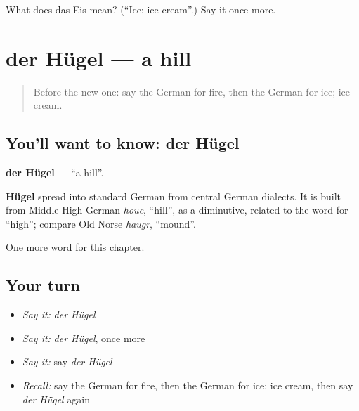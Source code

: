 \begin{tcolorbox}[breakable,colback=teal!4,colframe=teal!35!black,title={Before you move on}]
What does das Eis mean? (\textquotedblleft{}Ice; ice cream\textquotedblright{}.) Say it once more.
\end{tcolorbox}
\section[der Hügel]{der Hügel — a hill}

\label{lesson:GE-C85-huegel}



\begin{quote}
Before the new one: say the German for fire, then the German for ice; ice cream.
\end{quote}

\subsection*{You'll want to know: der Hügel}
\textbf{der Hügel} — \textquotedblleft{}a hill\textquotedblright{}.

\begin{cousinweb}
\textbf{Hügel} spread into standard German from central German dialects. It is built from Middle High German \emph{houc}, \textquotedblleft{}hill\textquotedblright{}, as a diminutive, related to the word for \textquotedblleft{}high\textquotedblright{}; compare Old Norse \emph{haugr}, \textquotedblleft{}mound\textquotedblright{}.
\end{cousinweb}

\begin{grammarlens}[title={What you've built}]
One more word for this chapter.
\end{grammarlens}

\subsection*{Your turn}
\begin{itemize}
\raggedright
  \item \emph{Say it:} \emph{der Hügel}
  \item \emph{Say it:} \emph{der Hügel}, once more
  \item \emph{Say it:} say \emph{der Hügel}
  \item \emph{Recall:} say the German for fire, then the German for ice; ice cream, then say \emph{der Hügel} again
\end{itemize}

